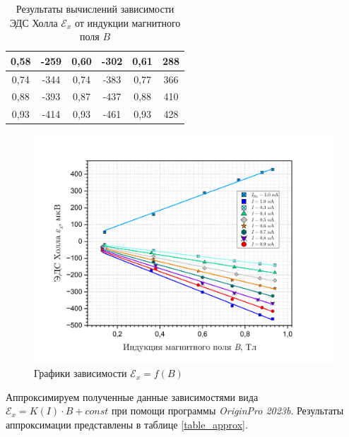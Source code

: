 \documentclass[a4paper, 12pt]{article}
\begin{document}
\begin{table}[H]
\begin{tabular}{cccccc}
        \multicolumn{1}{|c|}{0,58} & \multicolumn{1}{c|}{-259} & \multicolumn{1}{c|}{0,60} & \multicolumn{1}{c|}{-302} & \multicolumn{1}{c|}{0,61} & \multicolumn{1}{c|}{288} \\ \hline
        \multicolumn{1}{|c|}{0,74} & \multicolumn{1}{c|}{-344} & \multicolumn{1}{c|}{0,74} & \multicolumn{1}{c|}{-383} & \multicolumn{1}{c|}{0,77} & \multicolumn{1}{c|}{366} \\ \hline
        \multicolumn{1}{|c|}{0,88} & \multicolumn{1}{c|}{-393} & \multicolumn{1}{c|}{0,87} & \multicolumn{1}{c|}{-437} & \multicolumn{1}{c|}{0,88} & \multicolumn{1}{c|}{410} \\ \hline
        \multicolumn{1}{|c|}{0,93} & \multicolumn{1}{c|}{-414} & \multicolumn{1}{c|}{0,93} & \multicolumn{1}{c|}{-461} & \multicolumn{1}{c|}{0,93} & \multicolumn{1}{c|}{428} \\ \hline
        \end{tabular}
        \caption{Результаты вычислений зависимости ЭДС Холла $\mathcal{E}_x$ от индукции магнитного поля $B$}
        \label{measurement_EMF_2}
    \end{table}

    \begin{figure}[H]
        \centering
        \includegraphics[width = 15 cm]{images/graph_EDS.png}
        \caption{Графики зависимости $\mathcal{E}_x = f(B)$}
        \label{graph:EDS}
    \end{figure}

    Аппроксимируем полученные данные зависимостями вида $\mathcal{E}_x = K(I) \cdot B + const$ при помощи программы \textit{OriginPro 2023b}. Результаты аппроксимации представлены в таблице \ref{table_approx}.
\end{document}
